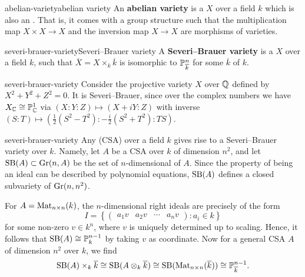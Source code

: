 \begin{topic}{abelian-variety}{abelian variety}
    An \textbf{abelian variety} is a   $X$ over a field $k$ which is also an . That is, it comes with a group structure such that the multiplication map $X \times X \to X$ and the inversion map $X \to X$ are morphisms of varieties.
\end{topic}

        

\begin{topic}{severi-brauer-variety}{Severi--Brauer variety}
    A \textbf{Severi--Brauer variety} is a  $X$ over a field $k$, such that $\overline{X} = X \times_k \overline{k}$ is isomorphic to $\mathbb{P}^n_{\overline{k}}$ for some  $\overline{k}$ of $k$.
\end{topic}

\begin{example}{severi-brauer-variety}
    Consider the projective variety $X$ over $\mathbb{Q}$ defined by $X^2 + Y^2 + Z^2 = 0$. It is Severi--Brauer, since over the complex numbers we have $X_{\mathbb{C}} \cong \mathbb{P}_{\mathbb{C}}^1$ via $(X : Y : Z) \mapsto (X + iY : Z)$ with inverse $(S : T) \mapsto (\tfrac{1}{2} (S^2 - T^2) : -\tfrac{i}{2} (S^2 + T^2) : TS)$.
\end{example}

\begin{example}{severi-brauer-variety}
    Any  (CSA) over a field $k$ gives rise to a Severi--Brauer variety over $k$. Namely, let $A$ be a CSA over $k$ of dimension $n^2$, and let $\textup{SB}(A) \subset \textup{Gr}(n, A)$ be the set of $n$-dimensional  of $A$. Since the property of being an ideal can be described by polynomial equations, $\textup{SB}(A)$ defines a closed subvariety of $\textup{Gr}(n, n^2)$.
    
    For $A = \textup{Mat}_{n \times n}(k)$, the $n$-dimensional right ideals are precisely of the form
    \[ I = \left\{ \begin{pmatrix} a_1 v & a_2 v & \cdots & a_n v \end{pmatrix} : a_i \in k \right\} \]
    for some non-zero $v \in k^n$, where $v$ is uniquely determined up to scaling. Hence, it follows that $\textup{SB}(A) \cong \mathbb{P}^{n - 1}_k$ by taking $v$ as coordinate. Now for a general CSA $A$ of dimension $n^2$ over $k$, we find
    \[ \textup{SB}(A) \times_k \overline{k} \cong \textup{SB}(A \otimes_k \overline{k}) \cong \textup{SB}(\textup{Mat}_{n \times n}(\overline{k})) \cong \mathbb{P}^{n - 1}_{\overline{k}} . \]
\end{example}

